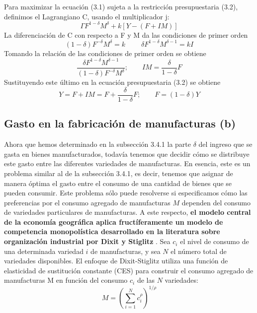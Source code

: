 \begin{nota}
    Para maximizar la ecuación (3.1) sujeta a la restricción presupuestaria (3.2), definimos el Lagrangiano C, usando el multiplicador j:
    $$\Gamma F^{1-\delta}M^\delta + k[Y-(F+IM)]$$
    La diferenciación de C con respecto a F y M da las condiciones de primer orden
    $$(1-\delta)F^{-\delta}M^\delta = k\; \qquad \delta F^{1-\delta}M^{\delta-1}=kI$$
    Tomando la relación de las condiciones de primer orden se obtiene
    $$\dfrac{\delta F^{1-\delta} M^{\delta - 1}}{(1-\delta)F^{-\delta}M^\delta};\qquad IM = \dfrac{\delta}{1-\delta}F$$
    Sustituyendo este último en la ecuación presupuestaria (3.2) se obtiene
    $$Y=F+IM = F+\dfrac{\delta}{1-\delta}F;\qquad F=(1-\delta)Y$$
\end{nota}

\subsection{Gasto en la fabricación de manufacturas (b)}
Ahora que hemos determinado en la subsección 3.4.1 la parte $\delta$ del ingreso que se gasta en bienes manufacturados, todavía tenemos que decidir cómo se distribuye este gasto entre las diferentes variedades de manufacturas. En esencia, este es un problema similar al de la subsección 3.4.1, es decir, tenemos que asignar de manera óptima el gasto entre el consumo de una cantidad de bienes que se pueden consumir. Este problema sólo puede resolverse si especificamos cómo las preferencias por el consumo agregado de manufacturas $M$ dependen del consumo de variedades particulares de manufacturas. A este respecto, \textbf{el modelo central de la economía geográfica aplica fructíferamente un modelo de competencia monopolística desarrollado en la literatura sobre organización industrial por Dixit y Stiglitz }. Sea $c_i$ el nivel de consumo de una determinada variedad $i$ de manufacturas, y sea $N$ el número total de variedades disponibles. El enfoque de Dixit-Stiglitz utiliza una función de elasticidad de sustitución constante (CES) para construir el consumo agregado de manufacturas M en función del consumo $c_i$ de las $N$ variedades:
\begin{equation}
    M=\left(\sum_{i=1}^N c^{\rho}_i \right)^{1/\rho}
\end{equation}

